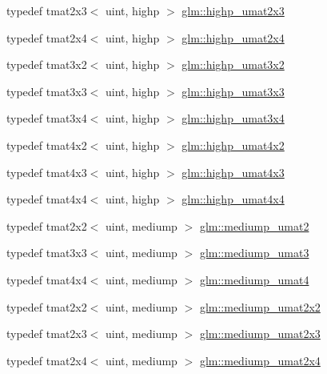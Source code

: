 \begin{DoxyCompactItemize}
\item 
typedef tmat2x3$<$ uint, highp $>$ \hyperlink{group__gtc__matrix__integer_gab058a0a12ea7f604d92baeb7a0e54f3b}{glm\-::highp\-\_\-umat2x3}
\item 
typedef tmat2x4$<$ uint, highp $>$ \hyperlink{group__gtc__matrix__integer_gafcec07e857ea0445d93680411e86482c}{glm\-::highp\-\_\-umat2x4}
\item 
typedef tmat3x2$<$ uint, highp $>$ \hyperlink{group__gtc__matrix__integer_ga7484178233773045088b42f362dade86}{glm\-::highp\-\_\-umat3x2}
\item 
typedef tmat3x3$<$ uint, highp $>$ \hyperlink{group__gtc__matrix__integer_ga770b01686af4fbbb13bbd7bd97d60fe4}{glm\-::highp\-\_\-umat3x3}
\item 
typedef tmat3x4$<$ uint, highp $>$ \hyperlink{group__gtc__matrix__integer_gaa2fb29026c9c80c7d17b5389e36d6aa7}{glm\-::highp\-\_\-umat3x4}
\item 
typedef tmat4x2$<$ uint, highp $>$ \hyperlink{group__gtc__matrix__integer_ga4015bf99a981bf271fd516f9b2cb6724}{glm\-::highp\-\_\-umat4x2}
\item 
typedef tmat4x3$<$ uint, highp $>$ \hyperlink{group__gtc__matrix__integer_gaa394320db559302e18c8b64013b8d7fb}{glm\-::highp\-\_\-umat4x3}
\item 
typedef tmat4x4$<$ uint, highp $>$ \hyperlink{group__gtc__matrix__integer_gaf5365128f6fd506442843fb5a441f385}{glm\-::highp\-\_\-umat4x4}
\item 
typedef tmat2x2$<$ uint, mediump $>$ \hyperlink{group__gtc__matrix__integer_ga85bc35173415dba31bb964c2940feeec}{glm\-::mediump\-\_\-umat2}
\item 
typedef tmat3x3$<$ uint, mediump $>$ \hyperlink{group__gtc__matrix__integer_ga953d4cb3e70d85567756b3fbcca0e9e9}{glm\-::mediump\-\_\-umat3}
\item 
typedef tmat4x4$<$ uint, mediump $>$ \hyperlink{group__gtc__matrix__integer_ga3eb3a5d85ec876ba65fad5525a5dda56}{glm\-::mediump\-\_\-umat4}
\item 
typedef tmat2x2$<$ uint, mediump $>$ \hyperlink{group__gtc__matrix__integer_gafce8777b8b0d9d7f810853b22de3be1b}{glm\-::mediump\-\_\-umat2x2}
\item 
typedef tmat2x3$<$ uint, mediump $>$ \hyperlink{group__gtc__matrix__integer_ga23dfc19249ad27dc4b02615f1d045ba1}{glm\-::mediump\-\_\-umat2x3}
\item 
typedef tmat2x4$<$ uint, mediump $>$ \hyperlink{group__gtc__matrix__integer_ga972445669c6e6652716f3f0b664b94cd}{glm\-::mediump\-\_\-umat2x4}
\item 

\end{DoxyCompactItemize}
